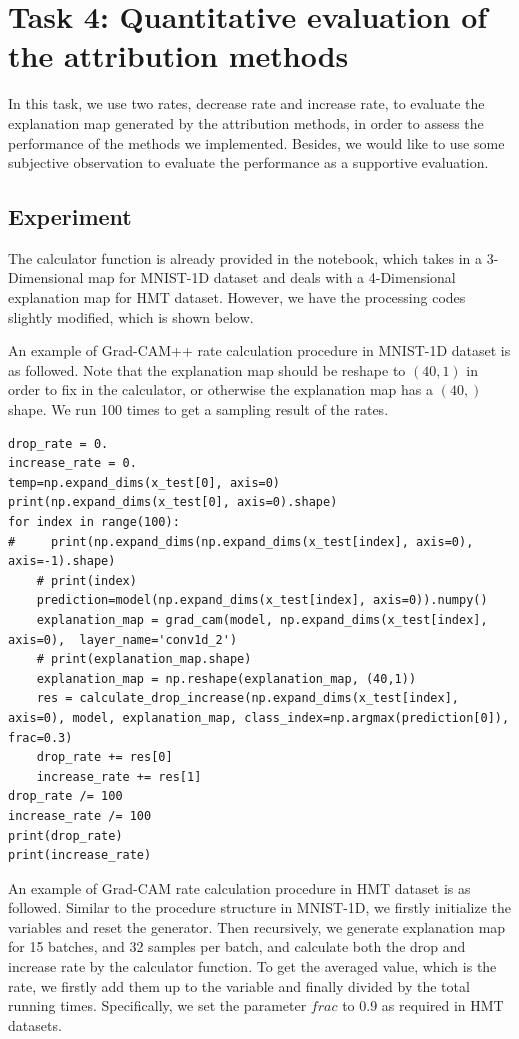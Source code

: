 \documentclass[conference]{IEEEtran}
\begin{document}

\section{Task 4: Quantitative evaluation of the attribution methods}

In this task, we use two rates, decrease rate and increase rate, to evaluate the explanation map generated by the attribution methods, in order to assess the performance of the methods we implemented. Besides, we would like to use some subjective observation to evaluate the performance as a supportive evaluation.

\subsection {Experiment}

The calculator function is already provided in the notebook, which takes in a 3-Dimensional map for MNIST-1D dataset and deals with a 4-Dimensional explanation map for HMT dataset. However, we have the processing codes slightly modified, which is shown below.

An example of Grad-CAM++ rate calculation procedure in MNIST-1D dataset is as followed. Note that the explanation map should be reshape to $(40,1)$ in order to fix in the calculator, or otherwise the explanation map has a $(40,)$ shape. We run 100 times to get a sampling result of the rates.

\begin{lstlisting}
drop_rate = 0.
increase_rate = 0.
temp=np.expand_dims(x_test[0], axis=0)
print(np.expand_dims(x_test[0], axis=0).shape)
for index in range(100):
#     print(np.expand_dims(np.expand_dims(x_test[index], axis=0), axis=-1).shape)
    # print(index)
    prediction=model(np.expand_dims(x_test[index], axis=0)).numpy()
    explanation_map = grad_cam(model, np.expand_dims(x_test[index], axis=0),  layer_name='conv1d_2')
    # print(explanation_map.shape)
    explanation_map = np.reshape(explanation_map, (40,1))
    res = calculate_drop_increase(np.expand_dims(x_test[index], axis=0), model, explanation_map, class_index=np.argmax(prediction[0]), frac=0.3)
    drop_rate += res[0]
    increase_rate += res[1]
drop_rate /= 100
increase_rate /= 100
print(drop_rate)
print(increase_rate)
\end{lstlisting}

An example of Grad-CAM rate calculation procedure in HMT dataset is as followed. Similar to the procedure structure in MNIST-1D, we firstly initialize the variables and reset the generator. Then recursively, we generate explanation map for 15 batches, and 32 samples per batch, and calculate both the drop and increase rate by the calculator function. To get the averaged value, which is the rate, we firstly add them up to the variable and finally divided by the total running times. Specifically, we set the parameter $frac$ to 0.9 as required in HMT datasets.
\end{document}
